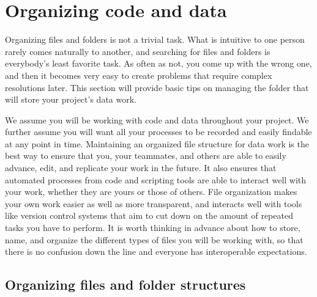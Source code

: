 \section{Organizing code and data}

Organizing files and folders is not a trivial task.
What is intuitive to one person rarely comes naturally to another,
and searching for files and folders is everybody's least favorite task.
As often as not, you come up with the wrong one,
and then it becomes very easy to create problems that require complex resolutions later.
This section will provide basic tips on managing the folder
that will store your project's data work.

We assume you will be working with code and data throughout your project.
We further assume you will want all your processes to be recorded
and easily findable at any point in time.
Maintaining an organized file structure for data work is the best way
to ensure that you, your teammates, and others
are able to easily advance, edit, and replicate your work in the future.
It also ensures that automated processes from code and scripting tools
are able to interact well with your work,
whether they are yours or those of others.
File organization makes your own work easier as well as more transparent,
and interacts well with tools like version control systems
that aim to cut down on the amount of repeated tasks you have to perform.
It is worth thinking in advance about how to store, name, and organize
the different types of files you will be working with,
so that there is no confusion down the line
and everyone has interoperable expectations.

\subsection{Organizing files and folder structures}

